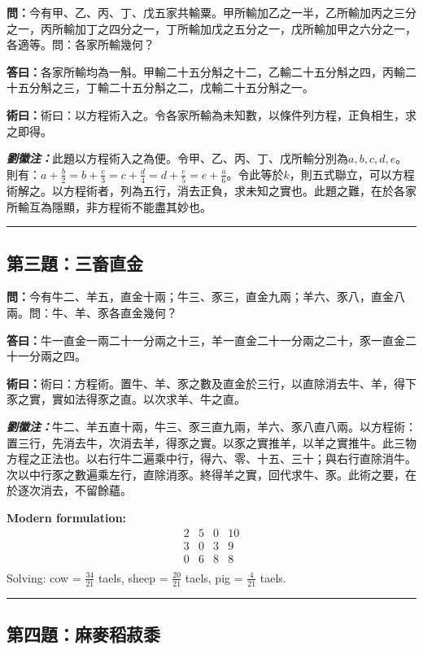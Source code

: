 \documentclass[11pt,a4paper]{article}
\newcommand{\wen}[1]{\textbf{\color{problemcolor}問：}#1\par}
\newcommand{\da}[1]{\textbf{答曰：}#1\par}
\newcommand{\shu}[1]{\textbf{術曰：}#1\par}
\newcommand{\liuhui}[1]{{\color{commentarycolor}\textit{\textbf{劉徽注：}}#1\par}}
\begin{document}
\wen{今有甲、乙、丙、丁、戊五家共輸粟。甲所輸加乙之一半，乙所輸加丙之三分之一，丙所輸加丁之四分之一，丁所輸加戊之五分之一，戊所輸加甲之六分之一，各適等。問：各家所輸幾何？}

\da{各家所輸均為一斛。甲輸二十五分斛之十二，乙輸二十五分斛之四，丙輸二十五分斛之三，丁輸二十五分斛之二，戊輸二十五分斛之一。}

\shu{術曰：以方程術入之。令各家所輸為未知數，以條件列方程，正負相生，求之即得。}

\liuhui{此題以方程術入之為便。令甲、乙、丙、丁、戊所輸分別為$a, b, c, d, e$。則有：$a + \frac{b}{2} = b + \frac{c}{3} = c + \frac{d}{4} = d + \frac{e}{5} = e + \frac{a}{6}$。令此等於$k$，則五式聯立，可以方程術解之。以方程術者，列為五行，消去正負，求未知之實也。此題之難，在於各家所輸互為隱顯，非方程術不能盡其妙也。}

\bigskip
\hrule
\bigskip

\subsection{第三題：三畜直金}

\wen{今有牛二、羊五，直金十兩；牛三、豕三，直金九兩；羊六、豕八，直金八兩。問：牛、羊、豕各直金幾何？}

\da{牛一直金一兩二十一分兩之十三，羊一直金二十一分兩之二十，豕一直金二十一分兩之四。}

\shu{術曰：方程術。置牛、羊、豕之數及直金於三行，以直除消去牛、羊，得下豕之實，實如法得豕之直。以次求羊、牛之直。}

\liuhui{牛二、羊五直十兩，牛三、豕三直九兩，羊六、豕八直八兩。以方程術：置三行，先消去牛，次消去羊，得豕之實。以豕之實推羊，以羊之實推牛。此三物方程之正法也。以右行牛二遍乘中行，得六、零、十五、三十；與右行直除消牛。次以中行豕之數遍乘左行，直除消豕。終得羊之實，回代求牛、豕。此術之要，在於逐次消去，不留餘蘊。}

\textbf{Modern formulation:}
\[
\begin{array}{ccc|c}
2 & 5 & 0 & 10 \\
3 & 0 & 3 & 9 \\
0 & 6 & 8 & 8 \\
\end{array}
\]
Solving: cow = $\frac{34}{21}$ taels, sheep = $\frac{20}{21}$ taels, pig = $\frac{4}{21}$ taels.

\bigskip
\hrule
\bigskip

\subsection{第四題：麻麥稻菽黍}
\end{document}
